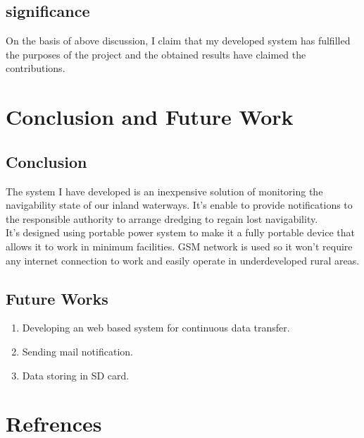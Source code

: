 \documentclass[12pt, top = 1 inch, bottom = 1 inch, left = 1.2 inch, top = .8 inch]{book}
\begin{document}
		\section{significance}
		On the basis of above discussion, I claim that my developed system has fulfilled the purposes of the project and the obtained results have claimed the contributions. 
		\chapter{Conclusion and Future Work}
		\section {Conclusion}
		The system I have developed is an inexpensive solution of monitoring the navigability state of our inland waterways. It's enable to provide notifications to the responsible authority to arrange dredging to regain lost navigability.\\
		It's designed using portable power system to make it a fully portable device that allows it to work in minimum facilities. GSM network is used so it won't require any internet connection to work and easily operate in underdeveloped rural areas.
		\section{Future Works}
		\begin{enumerate}
			\item Developing an web based system for continuous data transfer.
			\item Sending mail notification. 
			\item Data storing in SD card. 
		\end{enumerate}   
	\chapter{Refrences}	 
	
	
\end{document}
